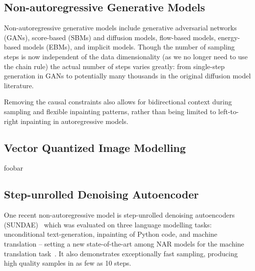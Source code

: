 \subsection{Non-autoregressive Generative Models}
\label{subsec:nagm}
Non-autoregressive generative models include generative adversarial networks
(GANs), score-based (SBMs) and diffusion models, flow-based models, energy-based
models (EBMs), and implicit models. Though the number of sampling steps is now
independent of the data dimensionality (as we no longer need to use the chain
rule) the actual number of steps varies greatly: from single-step generation in
GANs to potentially many thousands in the original diffusion model literature.


Removing the causal constraints also allows for bidirectional context during
sampling and flexible inpainting patterns, rather than being limited to
left-to-right inpainting in autoregressive models.

\subsection{Vector Quantized Image Modelling}
\label{subsec:vqmodelling}

foobar

\subsection{Step-unrolled Denoising Autoencoder}
\label{subsec:sundae}
One recent non-autoregressive model is step-unrolled denoising autoencoders
(SUNDAE)~\cite{savinov2022stepunrolled} which was evaluated on three language
modelling tasks: unconditional text-generation, inpainting of Python code, and
machine translation -- setting a new state-of-the-art among NAR models for the
machine translation task~\cite{savinov2022stepunrolled}. It also demonstrates
exceptionally fast sampling, producing high quality samples in as few as 10
steps.


